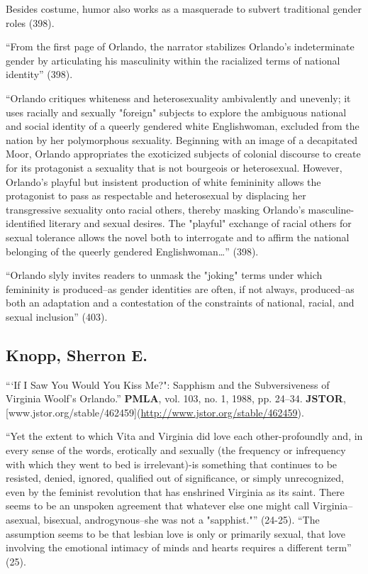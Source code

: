 \documentclass[11pt]{article}
\begin{document}
Besides costume, humor also works as a masquerade to subvert
traditional gender roles (398).

“From the first page of Orlando, the narrator stabilizes Orlando's
indeterminate gender by articulating his masculinity within the
racialized terms of national identity” (398).

“Orlando critiques whiteness and heterosexuality ambivalently and
unevenly; it uses racially and sexually "foreign" subjects to explore
the ambiguous national and social identity of a queerly gendered white
Englishwoman, excluded from the nation by her polymorphous sexuality.
Beginning with an image of a decapitated Moor, Orlando appropriates
the exoticized subjects of colonial discourse to create for its
protagonist a sexuality that is not bourgeois or heterosexual.
However, Orlando's playful but insistent production of white
femininity allows the protagonist to pass as respectable and
heterosexual by displacing her transgressive sexuality onto racial
others, thereby masking Orlando's masculine-identified literary and
sexual desires. The "playful" exchange of racial others for sexual
tolerance allows the novel both to interrogate and to affirm the
national belonging of the queerly gendered Englishwoman…” (398).

“Orlando slyly invites readers to unmask the "joking" terms under
which femininity is produced--as gender identities are often, if not
always, produced--as both an adaptation and a contestation of the
constraints of national, racial, and sexual inclusion” (403).

\subsection{Knopp, Sherron E.}
\label{sec:org0716e76}
“‘If I Saw You Would You Kiss Me?": Sapphism and the Subversiveness of
Virginia Woolf's Orlando.” \textbf{PMLA}, vol. 103, no. 1, 1988, pp. 24–34.
\textbf{JSTOR},
[www.jstor.org/stable/462459](\url{http://www.jstor.org/stable/462459}).

“Yet the extent to which Vita and Virginia did love each
other-profoundly and, in every sense of the words, erotically and
sexually (the frequency or infrequency with which they went to bed is
irrelevant)-is something that continues to be resisted, denied,
ignored, qualified out of significance, or simply unrecognized, even
by the feminist revolution that has enshrined Virginia as its saint.
There seems to be an unspoken agreement that whatever else one might
call Virginia--asexual, bisexual, androgynous--she was not a
"sapphist."” (24-25). “The assumption seems to be that lesbian love is
only or primarily sexual, that love involving the emotional intimacy
of minds and hearts requires a different term” (25).
\end{document}
